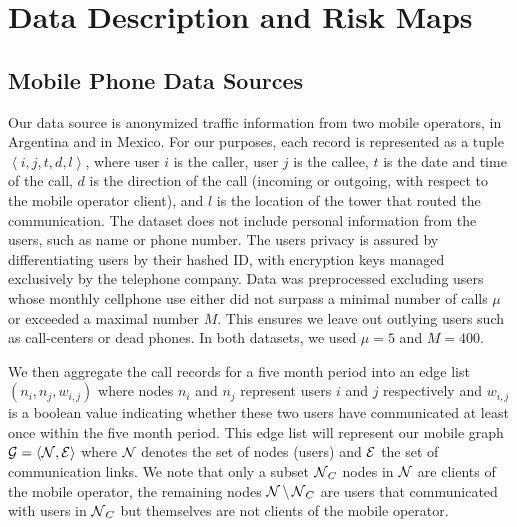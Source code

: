 
\chapter{Data Description and Risk Maps}
\label{cha:descr-risk}

\section{Mobile Phone Data Sources}

Our data source is anonymized traffic information from two mobile operators, in Argentina and in Mexico.
For our purposes, each record is represented as a tuple $\left < i, j, t, d, l \right >$,
where user $i$ is the caller, user $j$ is the callee, $t$ is the date and time of the call,
$d$ is the direction of the call (incoming or outgoing, with respect to the mobile operator client), and $l$ is the location of the tower that routed the communication.
The dataset does not include personal information from the users, such as name or phone number. The users privacy is assured by differentiating users by their hashed ID, with encryption keys managed exclusively by the telephone company.
Data was preprocessed excluding users whose monthly cellphone use either did not surpass a minimal number of calls $\mu$ or exceeded a maximal number $M$. This ensures we leave out outlying users such as call-centers or dead phones. In both datasets, we used $\mu = 5$ and $M = 400$.

We then aggregate the call records for a five 
month period into an edge list $(n_i, n_j, w_{i,j})$ where nodes $n_i$ and $n_j$ 
represent users $i$ and $j$ respectively and $w_{i,j}$ is a boolean value
indicating whether these two users have communicated at least once within the 
five month period. This edge list will represent our mobile graph  
$\operatorname{\mathcal{G}} = \left< \operatorname{\mathcal{N}}, \operatorname{\mathcal{E}} \right> $ where $\operatorname{\mathcal{N}}$ denotes the set of nodes (users) 
and $\operatorname{\mathcal{E}}$ the set of communication links. We note that only a subset $\operatorname{\mathcal{N}}_C$ nodes in $\operatorname{\mathcal{N}}$
are clients of the mobile operator, the remaining nodes $\operatorname{\mathcal{N}} \setminus \operatorname{\mathcal{N}}_C$ are
users that communicated with users in $ \operatorname{\mathcal{N}}_C $ but themselves are not clients of
the mobile operator. 

